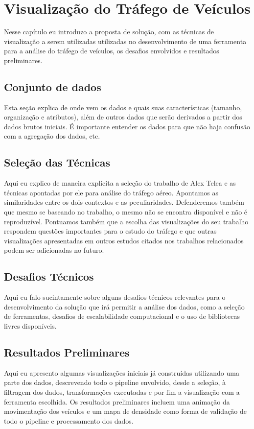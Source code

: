 \chapter{Visualização do Tráfego de Veículos}
\label{cap:visualizacao}

Nesse capítulo eu introduzo a proposta de solução, com as técnicas de visualização a
serem utilizadas utilizadas no desenvolvimento de uma ferramenta para a análise
do tráfego de veículos, os desafios envolvidos e resultados preliminares.

\section{Conjunto de dados}

Esta seção explica de onde vem os dados e quais suas características (tamanho, organização e atributos), além
de outros dados que serão derivados a partir dos dados brutos iniciais. É importante entender
os dados para que não haja confusão com a agregação dos dados, etc.

\section{Seleção das Técnicas}

Aqui eu explico de maneira explícita a seleção do trabalho de Alex Telea e as técnicas
apontadas por ele para análise do tráfego aéreo. Apontamos as similaridades entre
os dois contextos e as peculiaridades. Defenderemos também que mesmo se baseando
no trabalho, o mesmo não se encontra disponível e não é reproduzível. Pontuamos também
que a escolha das visualizações do seu trabalho respondem questões importantes
para o estudo do tráfego e que outras visualizações apresentadas em outros estudos citados
nos trabalhos relacionados podem ser adicionadas no futuro.

\section{Desafios Técnicos}

Aqui eu falo sucintamente sobre alguns desafios técnicos relevantes para o desenvolvimento da solução
que irá permitir a análise dos dados, como a seleção de ferramentas,
desafios de escalabilidade computacional e o uso de bibliotecas livres disponíveis.

\section{Resultados Preliminares}

Aqui eu apresento algumas visualizações iniciais já construídas
utilizando uma parte dos dados, descrevendo todo o pipeline envolvido, desde a seleção, à filtragem dos dados,
transformações executadas e por fim a visualização com a ferramenta escolhida.
Os resultados preliminares incluem uma animação da movimentação dos veículos e um mapa de densidade
como forma de validação de todo o pipeline e processamento dos dados.

